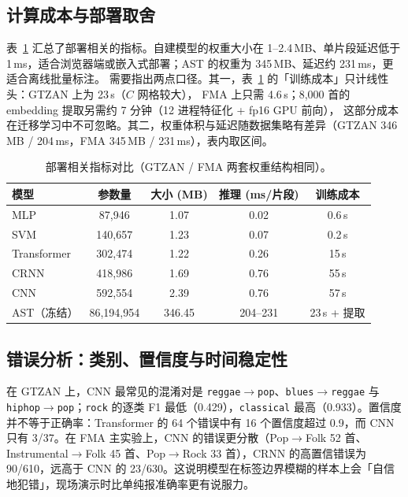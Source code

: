 \documentclass[UTF8,10pt,a4paper]{ctexart}
\begin{document}
\subsection{计算成本与部署取舍}\label{sec:cost}

表~\ref{tab:cost} 汇总了部署相关的指标。自建模型的权重大小在 1--2.4\,MB、单片段延迟低于
1\,ms，适合浏览器端或嵌入式部署；AST 的权重为 345\,MB、延迟约 231\,ms，更适合离线批量标注。
需要指出两点口径。其一，表~\ref{tab:cost} 的「训练成本」只计线性头：GTZAN 上为 23\,s（$C$ 网格较大），
FMA 上只需 4.6\,s；8,000 首的 embedding 提取另需约 7 分钟（12 进程特征化 + fp16 GPU 前向），
这部分成本在迁移学习中不可忽略。其二，权重体积与延迟随数据集略有差异（GTZAN 346\,MB /
204\,ms，FMA 345\,MB / 231\,ms），表内取区间。

\begin{table}[H]
\centering\small
\caption{部署相关指标对比（GTZAN / FMA 两套权重结构相同）。}
\label{tab:cost}
\begin{tabular}{lcccc}
\toprule
模型 & 参数量 & 大小 (MB) & 推理 (ms/片段) & 训练成本\\
\midrule
MLP & 87,946 & 1.07 & 0.02 & 0.6\,s\\
SVM & 140,657 & 1.23 & 0.07 & 0.2\,s\\
Transformer & 302,474 & 1.22 & 0.26 & 15\,s\\
CRNN & 418,986 & 1.69 & 0.76 & 55\,s\\
CNN & 592,554 & 2.39 & 0.76 & 57\,s\\
AST（冻结） & 86,194,954 & 346.45 & 204--231 & 23\,s + 提取\\
\bottomrule
\end{tabular}
\end{table}

\subsection{错误分析：类别、置信度与时间稳定性}\label{sec:error}
在 GTZAN 上，CNN 最常见的混淆对是 \texttt{reggae}$\rightarrow$\texttt{pop}、\texttt{blues}$\rightarrow$\texttt{reggae} 与 \texttt{hiphop}$\rightarrow$\texttt{pop}；\texttt{rock} 的逐类 F1 最低（0.429），\texttt{classical} 最高（0.933）。置信度并不等于正确率：Transformer 的 64 个错误中有 16 个置信度超过 0.9，而 CNN 只有 3/37。在 FMA 主实验上，CNN 的错误更分散（Pop$\rightarrow$Folk 52 首、Instrumental$\rightarrow$Folk 45 首、Pop$\rightarrow$Rock 33 首），CRNN 的高置信错误为 90/610，远高于 CNN 的 23/630。这说明模型在标签边界模糊的样本上会「自信地犯错」，现场演示时比单纯报准确率更有说服力。
\end{document}
